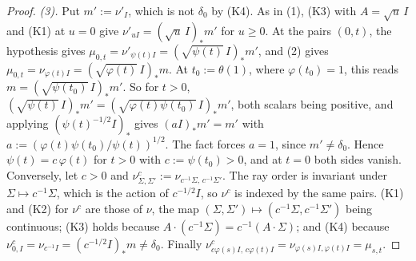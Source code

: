 \begin{proof}
\emph{(3).} Put $m' := \nu'_I$, which is not $\delta_0$ by (K4). As in (1), (K3) with
$A = \sqrt u\,I$ and (K1) at $u = 0$ give $\nu'_{uI} = (\sqrt u\,I)_*m'$ for $u \ge 0$. At the pairs
$(0, t)$, the hypothesis gives $\mu_{0,t} = \nu'_{\psi(t)I} = (\sqrt{\psi(t)}\,I)_*m'$, and (2) gives
$\mu_{0,t} = \nu_{\varphi(t)I} = (\sqrt{\varphi(t)}\,I)_*m$. At $t_0 := \theta(1)$, where
$\varphi(t_0) = 1$, this reads $m = (\sqrt{\psi(t_0)}\,I)_*m'$. So for $t > 0$,
$(\sqrt{\psi(t)}\,I)_*m' = (\sqrt{\varphi(t)\psi(t_0)}\,I)_*m'$, both scalars being positive, and
applying $(\psi(t)^{-1/2}I)_*$ gives $(aI)_*m' = m'$ with
$a := (\varphi(t)\psi(t_0)/\psi(t))^{1/2}$. The fact forces $a = 1$, since $m' \ne \delta_0$. Hence
$\psi(t) = c\,\varphi(t)$ for $t > 0$ with $c := \psi(t_0) > 0$, and at $t = 0$ both sides vanish.
Conversely, let $c > 0$ and $\nu^c_{\Sigma,\Sigma'} := \nu_{c^{-1}\Sigma,\,c^{-1}\Sigma'}$. The ray
order is invariant under $\Sigma \mapsto c^{-1}\Sigma$, which is the action of $c^{-1/2}I$, so
$\nu^c$ is indexed by the same pairs. (K1) and (K2) for $\nu^c$ are those of $\nu$, the map
$(\Sigma,\Sigma') \mapsto (c^{-1}\Sigma, c^{-1}\Sigma')$ being continuous; (K3) holds because
$A \cdot (c^{-1}\Sigma) = c^{-1}(A \cdot \Sigma)$; and (K4) because
$\nu^c_{0,I} = \nu_{c^{-1}I} = (c^{-1/2}I)_*m \ne \delta_0$. Finally
$\nu^c_{c\varphi(s)I,\,c\varphi(t)I} = \nu_{\varphi(s)I,\varphi(t)I} = \mu_{s,t}$.


\end{proof}

